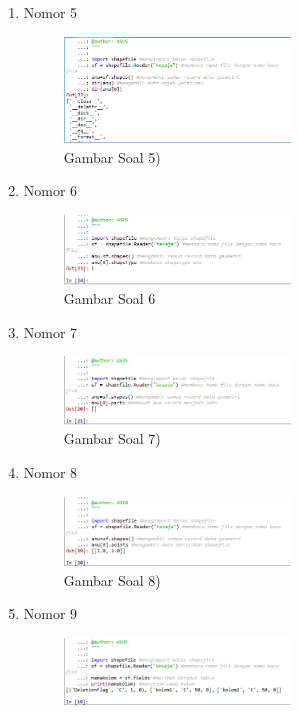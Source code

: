 \begin{enumerate}
 \item Nomor 5
 
 \begin{figure}[H]
  \includegraphics[width=6cm]{figures/Tugas3/1174077/no5.png}
  \centering
  \caption{Gambar Soal 5)}
 \end{figure}
 \item Nomor 6
 
 \begin{figure}[H]
  \includegraphics[width=6cm]{figures/Tugas3/1174077/no6.png}
  \centering
  \caption{Gambar Soal 6}
 \end{figure}
 \item Nomor 7
 
 \begin{figure}[H]
  \includegraphics[width=6cm]{figures/Tugas3/1174077/no7.png}
  \centering
  \caption{Gambar Soal 7)}
 \end{figure}
 \item Nomor 8
 
 \begin{figure}[H]
  \includegraphics[width=6cm]{figures/Tugas3/1174077/no8.png}
  \centering
  \caption{Gambar Soal 8)}
 \end{figure}
 \item Nomor 9
 
 \begin{figure}[H]
  \includegraphics[width=6cm]{figures/Tugas3/1174077/no9.png}

\end{figure}
\end{enumerate}
